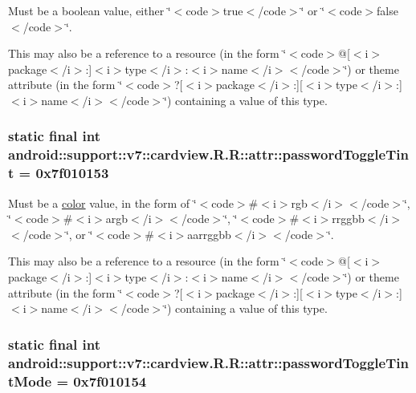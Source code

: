 Must be a boolean value, either \char`\"{}$<$code$>$true$<$/code$>$\char`\"{} or \char`\"{}$<$code$>$false$<$/code$>$\char`\"{}. 

This may also be a reference to a resource (in the form \char`\"{}$<$code$>$@\mbox{[}$<$i$>$package$<$/i$>$:\mbox{]}$<$i$>$type$<$/i$>$:$<$i$>$name$<$/i$>$$<$/code$>$\char`\"{}) or theme attribute (in the form \char`\"{}$<$code$>$?\mbox{[}$<$i$>$package$<$/i$>$:\mbox{]}\mbox{[}$<$i$>$type$<$/i$>$:\mbox{]}$<$i$>$name$<$/i$>$$<$/code$>$\char`\"{}) containing a value of this type. \hypertarget{classandroid_1_1support_1_1v7_1_1cardview_1_1_r_1_1attr_9f4c38942c26755f95f56dfc86904d65}{
\subsubsection[{passwordToggleTint}]{\setlength{\rightskip}{0pt plus 5cm}static final int android::support::v7::cardview.R.R::attr::passwordToggleTint = 0x7f010153}}
\label{classandroid_1_1support_1_1v7_1_1cardview_1_1_r_1_1attr_9f4c38942c26755f95f56dfc86904d65}


Must be a \hyperlink{classandroid_1_1support_1_1v7_1_1cardview_1_1_r_1_1color}{color} value, in the form of \char`\"{}$<$code$>$\#$<$i$>$rgb$<$/i$>$$<$/code$>$\char`\"{}, \char`\"{}$<$code$>$\#$<$i$>$argb$<$/i$>$$<$/code$>$\char`\"{}, \char`\"{}$<$code$>$\#$<$i$>$rrggbb$<$/i$>$$<$/code$>$\char`\"{}, or \char`\"{}$<$code$>$\#$<$i$>$aarrggbb$<$/i$>$$<$/code$>$\char`\"{}. 

This may also be a reference to a resource (in the form \char`\"{}$<$code$>$@\mbox{[}$<$i$>$package$<$/i$>$:\mbox{]}$<$i$>$type$<$/i$>$:$<$i$>$name$<$/i$>$$<$/code$>$\char`\"{}) or theme attribute (in the form \char`\"{}$<$code$>$?\mbox{[}$<$i$>$package$<$/i$>$:\mbox{]}\mbox{[}$<$i$>$type$<$/i$>$:\mbox{]}$<$i$>$name$<$/i$>$$<$/code$>$\char`\"{}) containing a value of this type. \hypertarget{classandroid_1_1support_1_1v7_1_1cardview_1_1_r_1_1attr_ae056f77b4877e47736203c6e8a2b9fb}{
\subsubsection[{passwordToggleTintMode}]{\setlength{\rightskip}{0pt plus 5cm}static final int android::support::v7::cardview.R.R::attr::passwordToggleTintMode = 0x7f010154}}
\label{classandroid_1_1support_1_1v7_1_1cardview_1_1_r_1_1attr_ae056f77b4877e47736203c6e8a2b9fb}


